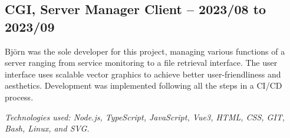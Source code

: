 \documentclass{article}
\begin{document}
\begin{minipage}[t]{0.7\textwidth}
		\vspace{15pt} %
		\subsection*{\textcolor{colorTitelErfarenhet}{CGI, Server Manager Client – 2023/08 to 2023/09}}
		Björn was the sole developer for this project, managing various functions of a server ranging from service monitoring to a file retrieval interface. The user interface uses scalable vector graphics to achieve better user-friendliness and aesthetics. Development was implemented following all the steps in a CI/CD process.
		
		\vspace{5pt}\textit{Technologies used: Node.js, TypeScript, JavaScript, Vue3, HTML, CSS, GIT, Bash, Linux, and SVG.}
		
	\end{minipage}%
	\hfill
\end{document}
